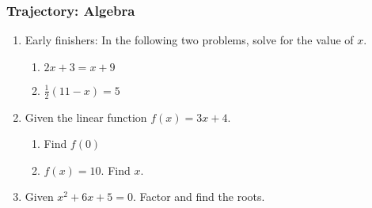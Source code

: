 

\fancyhead[LE]{\thepage}



\subsubsection*{Trajectory: Algebra}
\begin{enumerate}
\item Early finishers: In the following two problems, solve for the value of $x$.
  \begin{multicols}{2}
    \begin{enumerate}
      \item   $2x+3=x + 9$ \vspace{6cm}
      \item   $\frac{1}{2}(11-x)=5$ \vspace{3cm}
    \end{enumerate}
  \end{multicols}
  \vspace{3cm}

\item Given the linear function $f(x)=3x+4$.
\begin{multicols}{2}
  \begin{enumerate}
    \item Find $f(0)$ \vspace{6cm}
    \item   $f(x)=10$. Find $x$. \vspace{3cm}
  \end{enumerate}
\end{multicols}
  \vspace{3cm}

\item Given $x^2+6x+5=0$. Factor and find the roots. %

\end{enumerate}
